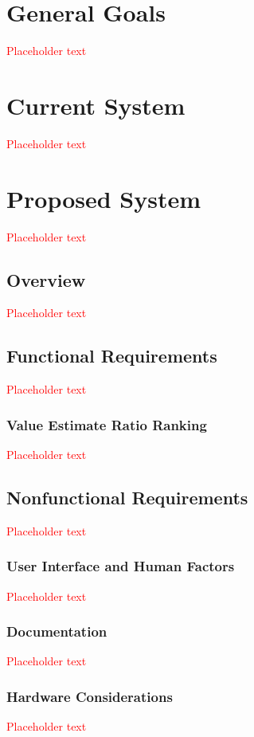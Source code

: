 \documentclass[a4paper, 11pt, titlepage]{article}
\begin{document}
\pagebreak
{}

\section{General Goals}
\textcolor{red}{Placeholder text}

\section{Current System}
\textcolor{red}{Placeholder text}

\section{Proposed System}
\textcolor{red}{Placeholder text}

\subsection{Overview}
\textcolor{red}{Placeholder text}

\subsection{Functional Requirements}
\textcolor{red}{Placeholder text}

\subsubsection{Value Estimate Ratio Ranking}
\textcolor{red}{Placeholder text}

\subsection{Nonfunctional Requirements}
\textcolor{red}{Placeholder text}

\subsubsection{User Interface and Human Factors}
\textcolor{red}{Placeholder text}

\subsubsection{Documentation}
\textcolor{red}{Placeholder text}

\subsubsection{Hardware Considerations}
\textcolor{red}{Placeholder text}
\end{document}
